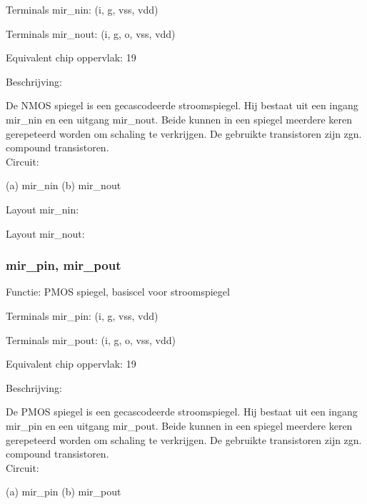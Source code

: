 Terminals mir\_nin: (i, g, vss, vdd)

Terminals mir\_nout: (i, g, o, vss, vdd)

Equivalent chip oppervlak: 19

Beschrijving:

De NMOS spiegel is een gecascodeerde stroomspiegel. 
Hij bestaat uit een ingang mir\_nin en een uitgang
mir\_nout.
Beide kunnen in een spiegel meerdere keren gerepeteerd
worden om schaling te verkrijgen.
De gebruikte transistoren zijn zgn. compound transistoren.\\

Circuit:

(a) mir\_nin \hspace{0.2\textwidth} (b) mir\_nout\\

\medskip
\begin{figure}[h]
{}
\end{figure}
\newpage
Layout mir\_nin:
\begin{figure}[h]
\centerline{}
\end{figure}

Layout mir\_nout:
\begin{figure}[h]
\centerline{}
\end{figure}
\clearpage

\subsubsection {mir\_pin, mir\_pout}
Functie: PMOS spiegel, basiscel voor stroomspiegel

Terminals mir\_pin: (i, g, vss, vdd)

Terminals mir\_pout: (i, g, o, vss, vdd)

Equivalent chip oppervlak: 19

Beschrijving:

De PMOS spiegel is een gecascodeerde stroomspiegel. 
Hij bestaat uit een ingang mir\_pin en een uitgang
mir\_pout.
Beide kunnen in een spiegel meerdere keren gerepeteerd
worden om schaling te verkrijgen.
De gebruikte transistoren zijn zgn. compound transistoren.\\

Circuit:

(a) mir\_pin \hspace{0.2\textwidth} (b) mir\_pout\\


